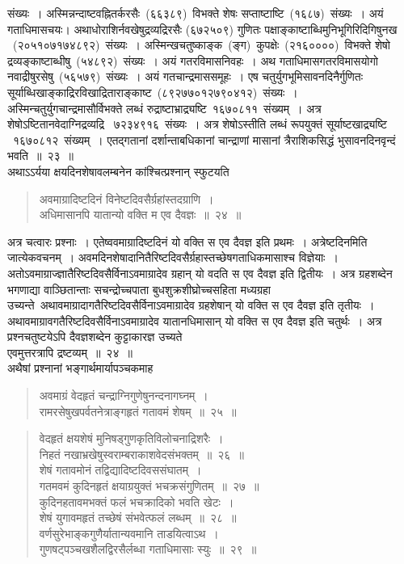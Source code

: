 \documentclass[11pt, openany]{book}
\begin{document}
\newpage
\thispagestyle{fancy}
\fancyhf{}
\noindent
संख्यः~। अस्मिन्नन्दाष्टवह्नितर्करसैः~(६६३८९)~विभक्ते शेषः सप्ताष्टाष्टि~(१६८७)~संख्यः~। अयं गताधिमासचयः। अथाधोराशिर्नवखेषुद्रव्यद्रिरसैः (६७२५०९) गुणितः पक्षाङ्काष्टाब्धिमुनिभूगिरिदिगिषुनख ~(२०५१०७१७४८९२)~संख्यः~। अस्मिन्खचतुष्काङ्क~(ङ्ग)~कुपक्षेः~(२१६००००)~विभक्ते शेषो द्रव्यङ्काष्टाब्धीषु~(५४८९२)~संख्यः~। अयं गतरविमासनिवहः~। अथ गताधिमासगतरविमासयोगो नवाद्रीषुरसेषु~(५६५७९)~संख्यः~। अयं गतचान्द्रमाससमूहः~। एष चतुर्युगभूमिसावनदिनैर्गुणितः सूर्याब्धिखाङ्काद्रिरविखाद्रिताराङ्काष्ट~(८९२७७०१२७९०४१२)~संख्यः~। अस्मिन्चतुर्युगचान्द्रमासौर्विभक्ते लब्धं रुद्राष्टाभ्राद्र्यष्टि~१६७०८११~संख्यम्~। अत्र शेषोऽष्टितानवेदाग्निद्रव्यद्रि
~७२३४९१६~संख्यः~। अत्र शेषोऽस्तीति लब्धं रूपयुक्तं सूर्याष्टखाद्र्यष्टि
~१६७०८१२~संख्यम्~। एतद्गतानां दर्शान्ताबधिकानां चान्द्राणां मासानां त्रैराशिकसिद्धं भुसावनदिनवृन्दं भवति~॥~२३~॥\\
\indent
अथाऽऽर्यया क्षयदिनशेषावलम्बनेन कांश्चित्प्रश्नान् स्फुटयति\textendash
\begin{quote}
{\ks अवमाग्रादिष्टदिनं विनेष्टदिवसैर्ग्रहांस्तदग्राणि~।\\
अधिमासानपि यातान्यो वक्ति म एव दैवज्ञः~॥~२४~॥}
\end{quote}
\indent
अत्र चत्वारः प्रश्नाः~। एतेष्ववमाग्रादिष्टदिनं यो वक्ति स एव दैवज्ञ इति प्रथमः~। अत्रेष्टदिनमिति जात्येकवचनम्~। अवमदिनशेषादानितैरिष्टदिवसैर्ग्रहास्तच्छेषगताधिकमासाश्च विज्ञेयाः~। अतोऽवमाग्राज्ज्ञातैरिष्टदिवसैर्विनाऽवमाग्रादेव ग्रहान् यो वदति स एव दैवज्ञ इति द्वितीयः~। अत्र ग्रहशब्देन भगणाद्या वाञ्छितान्ताः सचन्द्रोच्चपाता बुधशुक्रशीघ्रोच्चसहिता मध्यग्रहा उच्यन्ते\textendash\ अथावमाग्रादागतैरिष्टदिवसैर्विनाऽवमाग्रादेव ग्रहशेषान् यो वक्ति स एव दैवज्ञ इति तृतीयः~। अथावमाग्रावगतैरिष्टदिवसैर्विनाऽवमाग्रादेव यातानधिमासान् यो वक्ति स एव दैवज्ञ इति चतुर्थः~। अत्र प्रश्नचतुष्टयेऽपि दैवज्ञशब्देन कुट्टाकारज्ञ उच्यते\textendash\\एवमुत्तरत्रापि द्रष्टव्यम्~॥~२४~॥ \\
\indent
अथैषां प्रश्नानां भङ्गार्थमार्यापञ्चकमाह\textendash
\begin{quote}
{\ks अवमाग्रं वेदहृतं चन्द्राग्निगुणेषुनन्दनागघ्नम्~।\\
रामरसेषुखपर्वतनेत्राङ्गहृतं गतावमं शेषम्~॥~२५~॥}
\end{quote}

\newpage
\thispagestyle{fancy}
\fancyhf{}
\begin{quote}
{\ks वेदहृतं क्षयशेषं मुनिषड्गुणकृतिविलोचनाद्रिशरैः~।\\
निहतं नखाभ्रखेषुस्वराम्बराकाशवेदसंभक्तम्~॥~२६~॥\\
शेषं गतावमोनं तद्विद्यादिष्टदिवससंघातम्~।\\
गतमवमं कुदिनहृतं क्षयाग्रयुक्तं भचक्रसंगुणितम्~॥~२७~॥\\
कुदिनहतावमभक्तं फलं भचक्रादिको भवति खेटः~।\\
शेषं युगावमहृतं तच्छेषं संभवेत्फलं लब्धम्~॥~२८~॥\\
वर्णसुरेभाङ्कगुणैर्यातान्यवमानि ताडयित्वाऽथ~।\\
गुणषट्पञ्चखशैलद्विरसैर्लब्धा गताधिमासाः स्युः~॥~२९~॥}
\end{quote}
\end{document}
